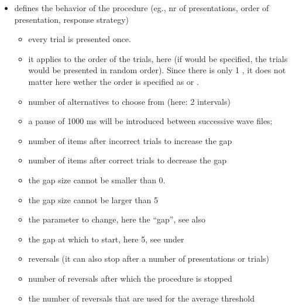 \begin{itemize}
\item {} defines the behavior of the procedure
(eg., nr of presentations, order of presentation, response
strategy)

\begin{itemize}
\item {} every trial is presented once.

\item {} it applies to the order of the trials, here
 (if  would be specified, the
trials would be presented in random order). Since there is only 1
, it does not matter here wether the order is
specified as  or .

\item {} number of alternatives to choose from
(here: 2 intervals)

\item {} a pause of 1000 ms will be
introduced between successive wave files;

\item {} number of items after incorrect trials to
increase the gap

\item {} number of items after correct trials to
decrease the gap

\item {} the gap size cannot be smaller than 0.

 \item {} the gap size cannot be larger than 5

\item {} the parameter to change, here the
``gap'', see also 

\item {} the gap at which to start, here 5, see
under 

\item {} reversals (it can also stop after
a number of presentations or trials)

\item {} number of reversals after which the
procedure is stopped

\item {} the number of reversals that are used
for the average threshold


\end{itemize}
\end{itemize}
